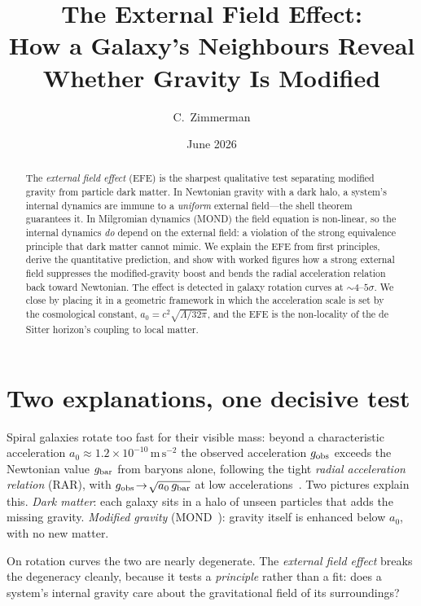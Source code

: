 \documentclass[aps,prd,twocolumn,10pt,nofootinbib]{revtex4-2}
\begin{document}
\title{The External Field Effect:\\ How a Galaxy's Neighbours Reveal Whether Gravity Is Modified}
\author{C.\ Zimmerman}
\date{June 2026}

\begin{abstract}
The \emph{external field effect} (EFE) is the sharpest qualitative test separating modified gravity from
particle dark matter. In Newtonian gravity with a dark halo, a system's internal dynamics are immune to a
\emph{uniform} external field---the shell theorem guarantees it. In Milgromian dynamics (MOND) the field
equation is non-linear, so the internal dynamics \emph{do} depend on the external field: a violation of the
strong equivalence principle that dark matter cannot mimic. We explain the EFE from first principles, derive the
quantitative prediction, and show with worked figures how a strong external field suppresses the
modified-gravity boost and bends the radial acceleration relation back toward Newtonian. The effect is detected
in galaxy rotation curves at $\sim\!4\text{--}5\sigma$. We close by placing it in a geometric framework in which
the acceleration scale is set by the cosmological constant, $a_0=c^2\sqrt{\Lambda/32\pi}$, and the EFE is the
non-locality of the de Sitter horizon's coupling to local matter.
\end{abstract}

\maketitle

\section{Two explanations, one decisive test}
Spiral galaxies rotate too fast for their visible mass: beyond a characteristic acceleration
$a_0\approx1.2\times10^{-10}\,\mathrm{m\,s^{-2}}$ the observed acceleration $g_{\rm obs}$ exceeds the Newtonian
value $g_{\rm bar}$ from baryons alone, following the tight \emph{radial acceleration relation} (RAR), with
$g_{\rm obs}\!\to\!\sqrt{a_0\,g_{\rm bar}}$ at low accelerations~\cite{McGaugh2016}. Two pictures explain this.
\emph{Dark matter}: each galaxy sits in a halo of unseen particles that adds the missing gravity.
\emph{Modified gravity} (MOND~\cite{Milgrom1983}): gravity itself is enhanced below $a_0$, with no new matter.

On rotation curves the two are nearly degenerate. The \emph{external field effect} breaks the degeneracy
cleanly, because it tests a \emph{principle} rather than a fit: does a system's internal gravity care about the
gravitational field of its surroundings?
\end{document}
